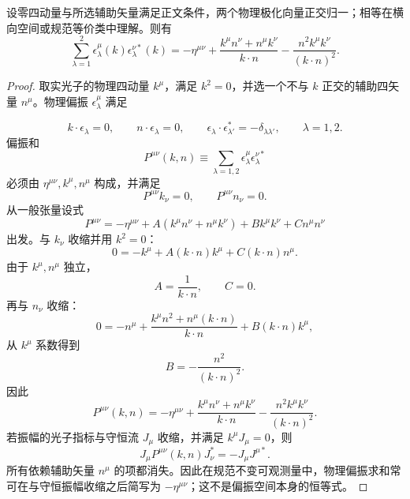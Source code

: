 \begin{proposition}[物理极化空间的协变完备投影]
设零四动量与所选辅助矢量满足正文条件，两个物理极化向量正交归一；相等在横向空间或规范等价类中理解。则有
\begin{equation}
 {
 \sum_{\lambda=1}^{2}
 \epsilon_\lambda^\mu(k)\epsilon_\lambda^{\nu *}(k)
 =-\eta^{\mu\nu}
 +\frac{k^\mu n^\nu+n^\mu k^\nu}{k\!\cdot n}
 -\frac{n^2k^\mu k^\nu}{(k\!\cdot n)^2}.}
\label{eq:physical-photon-polarization-projector-dp42}
\end{equation}
\end{proposition}
\begin{proof}
取实光子的物理四动量 $k^\mu$，满足 $k^2=0$，并选一个不与 $k$ 正交的辅助四矢量 $n^\mu$。物理偏振 $\epsilon_\lambda^\mu$ 满足

\begin{equation*}
 k\!\cdot\epsilon_\lambda=0,
 \qquad
 n\!\cdot\epsilon_\lambda=0,
 \qquad
 \epsilon_\lambda\!\cdot\epsilon_{\lambda'}^*=-\delta_{\lambda\lambda'},
 \qquad \lambda=1,2.
\end{equation*}
偏振和
\begin{equation*}
 P^{\mu\nu}(k,n)
 \equiv\sum_{\lambda=1,2}
 \epsilon_\lambda^\mu\epsilon_\lambda^{\nu*}
\end{equation*}
必须由 $\eta^{\mu\nu},k^\mu,n^\mu$ 构成，并满足
\begin{equation*}
 P^{\mu\nu}k_\nu=0,
 \qquad
 P^{\mu\nu}n_\nu=0.
\end{equation*}
从一般张量设式
\begin{equation*}
 P^{\mu\nu}
 =-\eta^{\mu\nu}
 +A(k^\mu n^\nu+n^\mu k^\nu)
 +B k^\mu k^\nu
 +C n^\mu n^\nu
\end{equation*}
出发。与 $k_\nu$ 收缩并用 $k^2=0$：
\begin{equation*}
 0=-k^\mu+A(k\!\cdot n)k^\mu+C(k\!\cdot n)n^\mu.
\end{equation*}
由于 $k^\mu,n^\mu$ 独立，
\begin{equation*}
 A=\frac1{k\!\cdot n},
 \qquad C=0.
\end{equation*}
再与 $n_\nu$ 收缩：
\begin{equation*}
 0=-n^\mu+\frac{k^\mu n^2+n^\mu(k\!\cdot n)}{k\!\cdot n}
 +B(k\!\cdot n)k^\mu,
\end{equation*}
从 $k^\mu$ 系数得到
\begin{equation*}
 B=-\frac{n^2}{(k\!\cdot n)^2}.
\end{equation*}
因此
\begin{equation*}
 {
 P^{\mu\nu}(k,n)
 =-\eta^{\mu\nu}
 +\frac{k^\mu n^\nu+n^\mu k^\nu}{k\!\cdot n}
 -\frac{n^2k^\mu k^\nu}{(k\!\cdot n)^2}.}
 \end{equation*}
若振幅的光子指标与守恒流 $J_\mu$ 收缩，并满足 $k^\mu J_\mu=0$，则
\begin{equation*}
 {
 J_\mu P^{\mu\nu}(k,n)J_\nu^*
 =-J_\mu J^{\mu*}.}
 \end{equation*}
所有依赖辅助矢量 $n^\mu$ 的项都消失。因此在规范不变可观测量中，物理偏振求和常可在与守恒振幅收缩之后简写为 $-\eta^{\mu\nu}$；这不是偏振空间本身的恒等式。
\end{proof}

